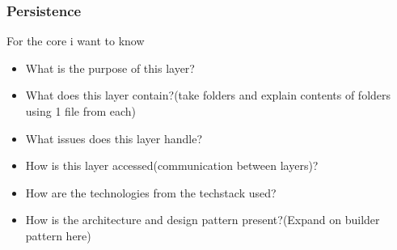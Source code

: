 \subsubsection{Persistence}
For the core i want to know
\begin{itemize}
    \item What is the purpose of this layer?
    \item What does this layer contain?(take folders and explain contents of folders using 1 file from each)
    \item What issues does this layer handle?
    \item How is this layer accessed(communication between layers)?
    \item How are the technologies from the techstack used?
    \item How is the architecture and design pattern present?(Expand on builder pattern here)
\end{itemize}
